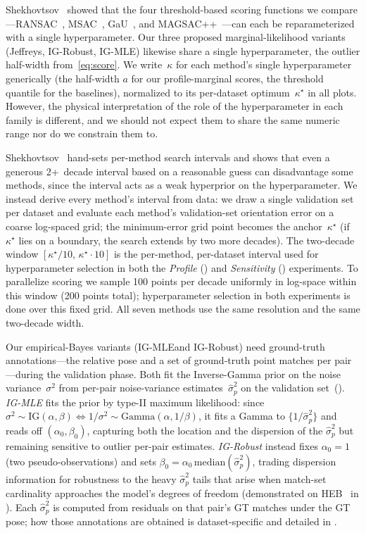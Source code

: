 \documentclass{article}
\newcommand{\IG}{\mathrm{IG}}
\newcommand{\mname}[1]{\texorpdfstring{#1\xspace}{#1}}
\newcommand{\pp}{\nolinebreak[4]\hspace{-0.05em}+\nolinebreak[4]\hspace{-0.05em}+}
\newcommand{\msac}{\mname{MSAC}}
\newcommand{\magsacpp}{\texorpdfstring{MAGSAC\pp\xspace}{MAGSAC++}}
\newcommand{\gau}{\mname{GaU}}
\newcommand{\igmle}{\mname{IG-MLE}}
\newcommand{\igrobust}{\mname{IG-Robust}}
\newcommand{\heb}{\mname{HEB}}
\newcommand{\invgamma}{Inverse-Gamma\xspace}
\begin{document}
Shekhovtsov~\cite{Shekhovtsov2025} showed that the four
threshold-based scoring functions we compare---RANSAC~\cite{Fischler1981},
\msac~\cite{Torr1998}, \gau~\cite{Torr2000}, and
\magsacpp~\cite{Barath2020}---can each be reparameterized with a
single hyperparameter.  Our three proposed marginal-likelihood variants (Jeffreys,
\igrobust, \igmle) likewise share a single hyperparameter, the
outlier half-width from~\eqref{eq:score}.  We write~$\kappa$ for
each method's single hyperparameter generically (the half-width
$a$ for our profile-marginal scores, the threshold quantile for the
baselines), normalized to its per-dataset optimum~$\kappa^\star$
in all plots.  However, the physical interpretation of the role of the
hyperparameter in each family is different, and we should not
expect them to share the same numeric range nor do we constrain
them to.

Shekhovtsov~\cite{Shekhovtsov2025} hand-sets per-method search
intervals and shows that even a generous 2+~decade interval
based on a reasonable guess can disadvantage some methods,
since the interval acts as a weak hyperprior on the
hyperparameter.  We instead derive every method's interval
from data: we draw a single validation set per dataset and
evaluate each method's validation-set orientation error on a coarse
log-spaced grid; the minimum-error grid point becomes the
anchor~$\kappa^\star$ (if $\kappa^\star$ lies on a boundary, the search extends
by two more decades).  The two-decade window
$[\kappa^\star/10,\,\kappa^\star\cdot 10]$ is the per-method, per-dataset
interval used for hyperparameter selection in both the
\emph{Profile} () and \emph{Sensitivity}
() experiments.  To parallelize
scoring we sample 100 points per decade uniformly in log-space
within this window (200 points total); hyperparameter
selection in both experiments is done over this fixed grid.
All seven methods use the same resolution and the same
two-decade width.

Our empirical-Bayes variants (\igmle and \igrobust) need
ground-truth annotations---the relative pose and a set of
ground-truth point matches per pair---during the validation
phase.  Both fit the \invgamma prior on the noise
variance~$\sigma^2$ from per-pair noise-variance
estimates~$\hat\sigma^2_p$ on the validation
set~().  \emph{\igmle} fits the
prior by type-II maximum likelihood: since
$\sigma^2\!\sim\!\IG(\alpha,\beta) \iff
	1/\sigma^2\!\sim\!\mathrm{Gamma}(\alpha,1/\beta)$, it fits a
Gamma to $\{1/\hat\sigma^2_p\}$ and reads off
$(\alpha_0,\beta_0)$, capturing both the location and the
dispersion of the $\hat\sigma^2_p$ but remaining sensitive to
outlier per-pair estimates.  \emph{\igrobust} instead fixes
$\alpha_0 = 1$ (two pseudo-observations) and sets
$\beta_0 = \alpha_0\,\mathrm{median}(\hat\sigma^2_p)$, trading
dispersion information for robustness to the heavy
$\hat\sigma^2_p$ tails that arise when match-set cardinality
approaches the model's degrees of freedom (demonstrated on
\heb~\cite{Barath2023} in ).  Each
$\hat\sigma^2_p$ is computed from residuals on that pair's GT
matches under the GT pose; how those annotations are obtained
is dataset-specific and detailed in .
\end{document}
